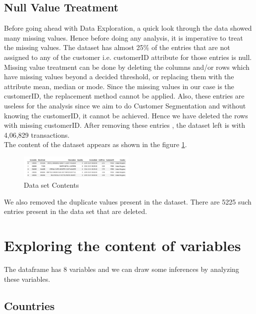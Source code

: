 \subsection{Null Value Treatment}
Before going ahead with Data Exploration, a quick look through the data showed many missing values. Hence before doing any analysis, it is imperative to treat the missing values. The dataset has almost 25\% of the entries that are not assigned to any of the customer i.e. customerID attribute for those entries is null. \\
Missing value treatment can be done by deleting the columns and/or rows which have missing values beyond a decided threshold, or replacing them with the attribute mean, median or mode. 
Since the missing values in our case is the customerID, the replacement method cannot be applied. Also, these entries are useless for the analysis since we aim to do Customer Segmentation and without knowing the customerID, it cannot be achieved. Hence we have deleted the rows with missing customerID. After removing these entries , the dataset left is with 4,06,829 transactions.\\

The content of the dataset appears as shown in the figure \ref{data}.

\begin{figure}[H]
\caption{Data set Contents}
\label{data}
\centering
\includegraphics[width=0.5\textwidth]{images/DatasetContent.PNG}
\end{figure}

We also removed the duplicate values present in the dataset. There are 5225 such entries present in the data set that are deleted.\\

\section{Exploring the content of variables}

The dataframe has 8 variables and we can draw some inferences by analyzing these variables.

\subsection{Countries}

